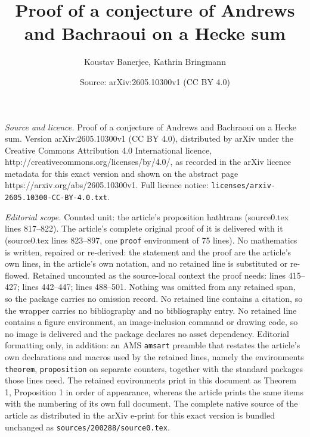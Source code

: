 \documentclass[10pt,a4paper]{amsart}
\title{Proof of a conjecture of Andrews and Bachraoui on a Hecke sum}
\author{Koustav Banerjee, Kathrin Bringmann}
\date{Source: arXiv:2605.10300v1 (CC BY 4.0)}
\begin{document}
\maketitle

\noindent\emph{Source and licence.} Proof of a conjecture of Andrews and Bachraoui on a Hecke sum. Version arXiv:2605.10300v1 (CC BY 4.0), distributed by arXiv under the Creative Commons Attribution 4.0 International licence, http://creativecommons.org/licenses/by/4.0/, as recorded in the arXiv licence metadata for this exact version and shown on the abstract page https://arxiv.org/abs/2605.10300v1. Full licence notice: \texttt{licenses/arxiv-2605.10300-CC-BY-4.0.txt}.\par\smallskip

\noindent\textit{Editorial scope.} Counted unit: the article's proposition hathtrans (source0.tex lines 817--822). The article's complete original proof of it is delivered with it (source0.tex lines 823--897, one \texttt{proof} environment of 75 lines). No mathematics is written, repaired or re-derived: the statement and the proof are the article's own lines, in the article's own notation, and no retained line is substituted or re-flowed.  Retained uncounted as the source-local context the proof needs: lines 415--427; lines 442--447; lines 488--501.  Nothing was omitted from any retained span, so the package carries no omission record.  No retained line contains a citation, so the wrapper carries no bibliography and no bibliography entry.  No retained line contains a figure environment, an image-inclusion command or drawing code, so no image is delivered and the package declares no asset dependency.  Editorial formatting only, in addition: an AMS \texttt{amsart} preamble that restates the article's own declarations and macros used by the retained lines, namely the environments \texttt{theorem}, \texttt{proposition} on separate counters, together with the standard packages those lines need.  The retained environments print in this document as Theorem 1, Proposition 1 in order of appearance, whereas the article prints the same items with the numbering of its own full document.  The complete native source of the article as distributed in the arXiv e-print for this exact version is bundled unchanged as \texttt{sources/200288/source0.tex}.
\end{document}
